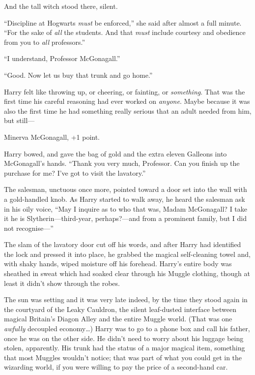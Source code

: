 And the tall witch stood there, silent.

“Discipline at Hogwarts \emph{must} be enforced,” she said after almost a full minute. “For the sake of \emph{all} the students. And that \emph{must} include courtesy and obedience from you to \emph{all} professors.”

“I understand, Professor McGonagall.”

“Good. Now let us buy that trunk and go home.”

Harry felt like throwing up, or cheering, or fainting, or \emph{something}. That was the first time his careful reasoning had ever worked on \emph{anyone}. Maybe because it was also the first time he had something really serious that an adult needed from him, but still—

Minerva McGonagall, +1 point.

Harry bowed, and gave the bag of gold and the extra eleven Galleons into McGonagall’s hands. “Thank you very much, Professor. Can you finish up the purchase for me? I’ve got to visit the lavatory.”

The salesman, unctuous once more, pointed toward a door set into the wall with a gold-handled knob. As Harry started to walk away, he heard the salesman ask in his oily voice, “May I inquire as to who that was, Madam McGonagall? I take it he is Slytherin—third-year, perhaps?—and from a prominent family, but I did not recognise—”

The slam of the lavatory door cut off his words, and after Harry had identified the lock and pressed it into place, he grabbed the magical self-cleaning towel and, with shaky hands, wiped moisture off his forehead. Harry’s entire body was sheathed in sweat which had soaked clear through his Muggle clothing, though at least it didn’t show through the robes.

\later

The sun was setting and it was very late indeed, by the time they stood again in the courtyard of the Leaky Cauldron, the silent leaf-dusted interface between magical Britain’s Diagon Alley and the entire Muggle world. (That was one \emph{awfully} decoupled economy…) Harry was to go to a phone box and call his father, once he was on the other side. He didn’t need to worry about his luggage being stolen, apparently. His trunk had the status of a major magical item, something that most Muggles wouldn’t notice; that was part of what you could get in the wizarding world, if you were willing to pay the price of a second-hand car.

